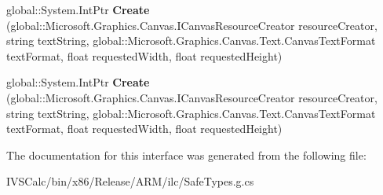 \begin{DoxyCompactItemize}
\item 
\mbox{\label{interface_microsoft_1_1_graphics_1_1_canvas_1_1_text_1_1_i_canvas_text_layout_factory_a654d0d251a9347d1808b81128c1ba60a}} 
global\+::\+System.\+Int\+Ptr {\bfseries Create} (global\+::\+Microsoft.\+Graphics.\+Canvas.\+I\+Canvas\+Resource\+Creator resource\+Creator, string text\+String, global\+::\+Microsoft.\+Graphics.\+Canvas.\+Text.\+Canvas\+Text\+Format text\+Format, float requested\+Width, float requested\+Height)
\item 
\mbox{\label{interface_microsoft_1_1_graphics_1_1_canvas_1_1_text_1_1_i_canvas_text_layout_factory_a654d0d251a9347d1808b81128c1ba60a}} 
global\+::\+System.\+Int\+Ptr {\bfseries Create} (global\+::\+Microsoft.\+Graphics.\+Canvas.\+I\+Canvas\+Resource\+Creator resource\+Creator, string text\+String, global\+::\+Microsoft.\+Graphics.\+Canvas.\+Text.\+Canvas\+Text\+Format text\+Format, float requested\+Width, float requested\+Height)
\end{DoxyCompactItemize}


The documentation for this interface was generated from the following file\+:\begin{DoxyCompactItemize}
\item 
I\+V\+S\+Calc/bin/x86/\+Release/\+A\+R\+M/ilc/Safe\+Types.\+g.\+cs\end{DoxyCompactItemize}
